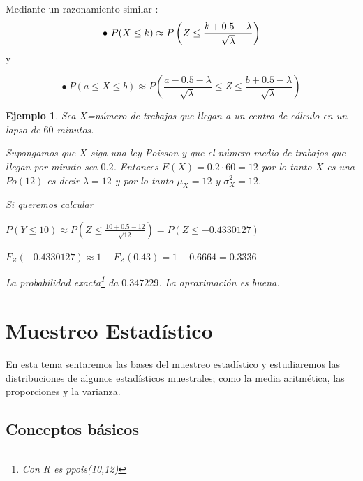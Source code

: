 \documentclass[12pt]{report}
\newtheorem{example}[definition]{Ejemplo}
\begin{document}
Mediante un razonamiento similar : $$\bullet\ P(X\leq k)\approx P\left(Z \leq
{{k+0.5-\lambda}\over \sqrt{\lambda}}\right)$$ y

$$\bullet\ P(a\leq X\leq b)\approx P\left(\frac{a-0.5-\lambda}{
\sqrt{\lambda}}\leq Z \leq \frac{b+0.5-\lambda}{ \sqrt{\lambda}}\right)$$

    \begin{example}
    Sea $X$=número de trabajos que llegan a un centro de cálculo en
    un lapso de $60$ minutos.

    Supongamos que $X$ siga una ley Poisson y que el número medio de
    trabajos que llegan por minuto sea $0.2$.
    Entonces $E(X)=0.2\cdot60=12$ por lo tanto $X$ es una $Po(12)$ es
    decir $\lambda =12$ y por lo tanto $\mu_X=12$ y $\sigma_X^2=12$.

    Si queremos calcular

    $P(Y\leq 10)\approx P(Z\leq \frac{10+0.5-12}{\sqrt{12}})=P(Z\leq -0.4330127)$

  $F_{Z}(-0.4330127)\approx 1-F_{Z}(0.43)=1-0.6664=0.3336$

La probabilidad exacta\footnote{Con R es  ppois(10,12) }  da $0.347229$. La aproximación es  buena.
\end{example}




%



\chapter{Muestreo Estadístico}
  
En esta tema sentaremos las bases del muestreo estadístico y estudiaremos las
distribuciones de algunos estadísticos muestrales; como la media aritmética, las proporciones y la varianza.

\section{Conceptos básicos}
\end{document}
